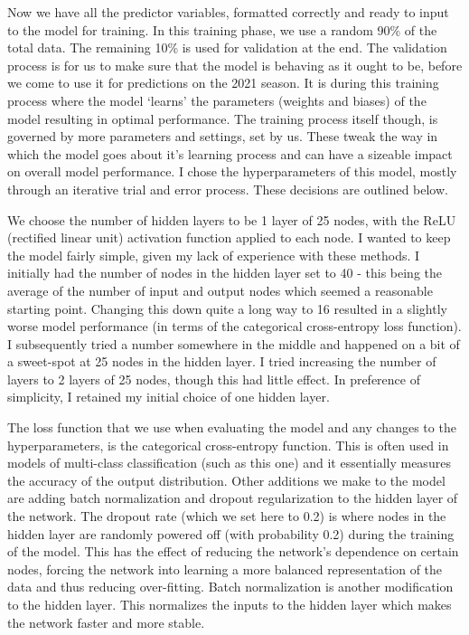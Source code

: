 Now we have all the predictor variables, formatted correctly and ready to input to the model for training. In this training phase, we use a random 90\% of the total data. The remaining 10\% is used for validation at the end. The validation process is for us to make sure that the model is behaving as it ought to be, before we come to use it for predictions on the 2021 season. It is during this training process where the model `learns' the parameters (weights and biases) of the model resulting in optimal performance. The training process itself though, is governed by more parameters and settings, set by us. These tweak the way in which the model goes about it's learning process and can have a sizeable impact on overall model performance. I chose the hyperparameters of this model, mostly through an iterative trial and error process. These decisions are outlined below.

We choose the number of hidden layers to be 1 layer of 25 nodes, with the ReLU (rectified linear unit) activation function applied to each node. I wanted to keep the model fairly simple, given my lack of experience with these methods. I initially had the number of nodes in the hidden layer set to 40 - this being the average of the number of input and output nodes which seemed a reasonable starting point. Changing this down quite a long way to 16 resulted in a slightly worse model performance (in terms of the categorical cross-entropy loss function). I subsequently tried a number somewhere in the middle and happened on a bit of a sweet-spot at 25 nodes in the hidden layer. I tried increasing the number of layers to 2 layers of 25 nodes, though this had little effect. In preference of simplicity, I retained my initial choice of one hidden layer.

The loss function that we use when evaluating the model and any changes to the hyperparameters, is the categorical cross-entropy function. This is often used in models of multi-class classification (such as this one) and it essentially measures the accuracy of the output distribution. \cite{noauthor_categorical_nodate} Other additions we make to the model are adding batch normalization and dropout regularization to the hidden layer of the network. The dropout rate (which we set here to 0.2) is where nodes in the hidden layer are randomly powered off (with probability 0.2) during the training of the model. This has the effect of reducing the network's dependence on certain nodes, forcing the network into learning a more balanced representation of the data and thus reducing over-fitting. \cite{ghatak_deep_2019} Batch normalization is another modification to the hidden layer. This normalizes the inputs to the hidden layer which makes the network faster and more stable. \cite{ioffe_batch_2015}

